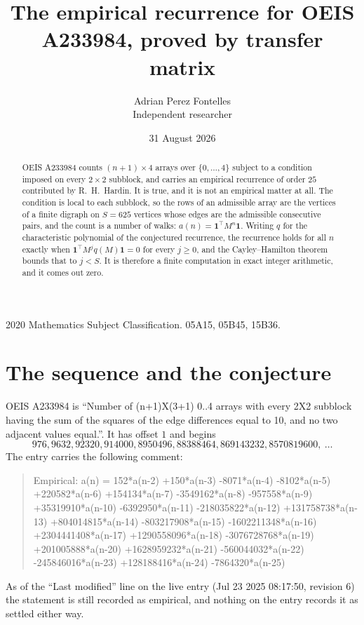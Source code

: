 \documentclass[11pt,a4paper]{article}
\title{The empirical recurrence for OEIS A233984, proved by transfer matrix}
\author{Adrian Perez Fontelles\\ \small Independent researcher}
\date{31 August 2026}
\theoremstyle{plain}
\theoremstyle{definition}
\begin{document}
\maketitle

\begin{abstract}
OEIS A233984 counts $(n+1)\times4$ arrays over $\{0,\dots,4\}$ subject to a condition imposed on
every $2\times2$ subblock, and carries an empirical recurrence of order $25$ contributed
by R.~H.~Hardin. It is true, and it is not an empirical matter at all. The condition is local
to each subblock, so the rows of an admissible array are the vertices of a finite digraph
on $S=625$ vertices whose edges are the admissible consecutive pairs, and the count is a
number of walks: $a(n)=\mathbf{1}^{\!\top}M^{n}\mathbf{1}$. Writing $q$
for the characteristic polynomial of the conjectured recurrence, the recurrence holds for all
$n$ exactly when $\mathbf{1}^{\!\top}M^{j}q(M)\mathbf{1}=0$ for every $j\ge0$, and the
Cayley--Hamilton theorem bounds that to $j<S$. It is therefore a finite computation in exact
integer arithmetic, and it comes out zero.
\end{abstract}

\noindent\small 2020 Mathematics Subject Classification. 05A15, 05B45, 15B36.\normalsize

\section{The sequence and the conjecture}

OEIS A233984 is ``Number of (n+1)X(3+1) 0..4 arrays with every 2X2 subblock having the sum of the squares of the edge differences equal to 10, and no two adjacent values equal.''. It has offset $1$ and begins
\[
976, 9632, 92320, 914000, 8950496, 88388464, 869143232, 8570819600,\ \dots
\]
The entry carries the following comment:
\begin{quote}\small
Empirical: a(n) = 152*a(n-2) +150*a(n-3) -8071*a(n-4) -8102*a(n-5) +220582*a(n-6) +154134*a(n-7) -3549162*a(n-8) -957558*a(n-9) +35319910*a(n-10) -6392950*a(n-11) -218035822*a(n-12) +131758738*a(n-13) +804014815*a(n-14) -803217908*a(n-15) -1602211348*a(n-16) +2304441408*a(n-17) +1290558096*a(n-18) -3076728768*a(n-19) +201005888*a(n-20) +1628959232*a(n-21) -560044032*a(n-22) -245846016*a(n-23) +128188416*a(n-24) -7864320*a(n-25)
\end{quote}
As of the ``Last modified'' line on the live entry (Jul 23 2025 08:17:50, revision 6) the statement is
still recorded as empirical, and nothing on the entry records it as settled either way.
\end{document}

